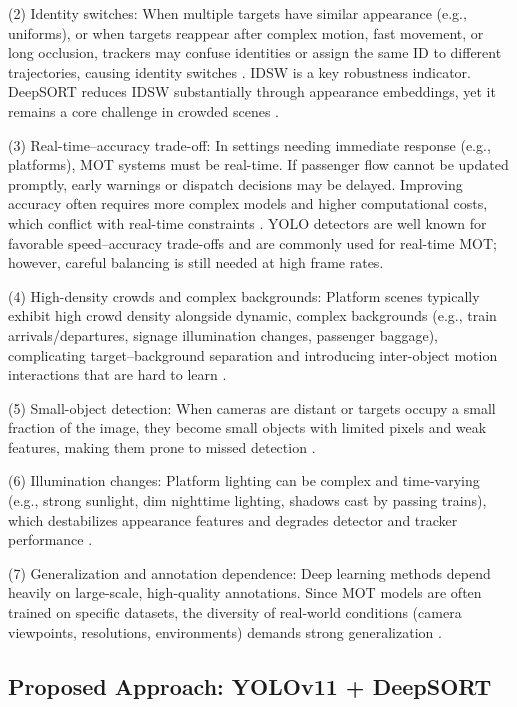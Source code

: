 (2) Identity switches: When multiple targets have similar appearance (e.g., uniforms), or when targets reappear after complex motion, fast movement, or long occlusion, trackers may confuse identities or assign the same ID to different trajectories, causing identity switches \cite{87}. IDSW is a key robustness indicator. DeepSORT reduces IDSW substantially through appearance embeddings, yet it remains a core challenge in crowded scenes \cite{134}.

(3) Real-time–accuracy trade-off: In settings needing immediate response (e.g., platforms), MOT systems must be real-time. If passenger flow cannot be updated promptly, early warnings or dispatch decisions may be delayed. Improving accuracy often requires more complex models and higher computational costs, which conflict with real-time constraints \cite{203}. YOLO detectors are well known for favorable speed–accuracy trade-offs and are commonly used for real-time MOT; however, careful balancing is still needed at high frame rates.

(4) High-density crowds and complex backgrounds: Platform scenes typically exhibit high crowd density alongside dynamic, complex backgrounds (e.g., train arrivals/departures, signage illumination changes, passenger baggage), complicating target–background separation and introducing inter-object motion interactions that are hard to learn \cite{86}. 

(5) Small-object detection: When cameras are distant or targets occupy a small fraction of the image, they become small objects with limited pixels and weak features, making them prone to missed detection \cite{28_kaur_comprehensive_2023}.

(6) Illumination changes: Platform lighting can be complex and time-varying (e.g., strong sunlight, dim nighttime lighting, shadows cast by passing trains), which destabilizes appearance features and degrades detector and tracker performance \cite{169}.

(7) Generalization and annotation dependence: Deep learning methods depend heavily on large-scale, high-quality annotations. Since MOT models are often trained on specific datasets, the diversity of real-world conditions (camera viewpoints, resolutions, environments) demands strong generalization \cite{02_noauthor_review_nodate}.

\subsection{Proposed Approach: YOLOv11 + DeepSORT}

